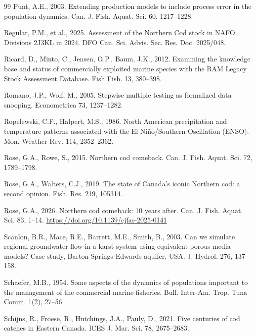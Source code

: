\documentclass[preprint,11pt,authoryear]{elsarticle}
\theoremstyle{definition}
\theoremstyle{remark}
\begin{document}
\begin{thebibliography}{99}
Punt, A.E., 2003. Extending production models to include process error in the population dynamics. Can. J. Fish. Aquat. Sci. 60, 1217--1228.

Regular, P.M., et al., 2025. Assessment of the Northern Cod stock in NAFO Divisions 2J3KL in 2024. DFO Can. Sci. Advis. Sec. Res. Doc. 2025/048.

Ricard, D., Minto, C., Jensen, O.P., Baum, J.K., 2012. Examining the knowledge base and status of commercially exploited marine species with the RAM Legacy Stock Assessment Database. Fish Fish. 13, 380--398.

Romano, J.P., Wolf, M., 2005. Stepwise multiple testing as formalized data snooping. Econometrica 73, 1237--1282.

Ropelewski, C.F., Halpert, M.S., 1986. North American precipitation and temperature patterns associated with the El Ni{\~n}o/Southern Oscillation (ENSO). Mon. Weather Rev. 114, 2352--2362.

Rose, G.A., Rowe, S., 2015. Northern cod comeback. Can. J. Fish. Aquat. Sci. 72, 1789--1798.

Rose, G.A., Walters, C.J., 2019. The state of Canada's iconic Northern cod: a second opinion. Fish. Res. 219, 105314.

Rose, G.A., 2026. Northern cod comeback: 10 years after. Can. J. Fish. Aquat. Sci. 83, 1--14. \url{https://doi.org/10.1139/cjfas-2025-0141}

Scanlon, B.R., Mace, R.E., Barrett, M.E., Smith, B., 2003. Can we simulate regional groundwater flow in a karst system using equivalent porous media models? Case study, Barton Springs Edwards aquifer, USA. J. Hydrol. 276, 137--158.

Schaefer, M.B., 1954. Some aspects of the dynamics of populations important to the management of the commercial marine fisheries. Bull. Inter-Am. Trop. Tuna Comm. 1(2), 27--56.

Schijns, R., Froese, R., Hutchings, J.A., Pauly, D., 2021. Five centuries of cod catches in Eastern Canada. ICES J. Mar. Sci. 78, 2675--2683.


\end{thebibliography}
\end{document}
